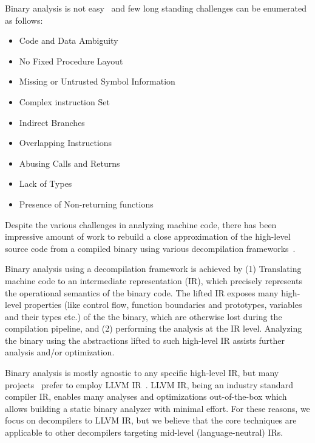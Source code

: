 Binary analysis is not easy~\cite{Meng:2016} and few long standing challenges
can be enumerated as follows:

\begin{itemize}
    \item Code and Data Ambiguity
    \item No Fixed Procedure Layout
    \item Missing or Untrusted Symbol Information
    \item Complex instruction Set
    \item Indirect Branches
    \item Overlapping Instructions
    \item Abusing Calls and Returns
    \item Lack of Types
    \item Presence of Non-returning functions
\end{itemize}

Despite the various challenges in analyzing machine code, there has been
impressive amount of work to rebuild a close approximation of the high-level
source code from a compiled binary using various decompilation
frameworks~\cite{McSema:Recon14,Remill,Angr1,BAP:CAV11,Radare2,FCD,BitBlaze:2008,hexray,Fokin:2011,eschulte2018bed,katz2018rnn,Schwartz:2013,IDA,mctoll,revgen}.

Binary analysis using a decompilation framework is achieved by (1) Translating machine code to an intermediate
representation (IR), which precisely represents the operational semantics of
the binary code. The lifted IR exposes many high-level properties (like control
    flow, function boundaries and prototypes, variables and their types etc.) of the
the binary, which are otherwise lost during the compilation pipeline, and (2)
  performing the analysis at the IR level.  Analyzing the binary using the
  abstractions lifted to such high-level IR assists further analysis and/or
  optimization. 

Binary analysis is mostly agnostic to any specific high-level IR, but many
projects~\cite{McSema:Recon14,Remill,FCD,reopt,mctoll} prefer to employ LLVM
IR~\cite{Lattner:2004}. LLVM IR, being an industry standard compiler IR,
  enables many analyses and optimizations out-of-the-box which allows building
  a static binary analyzer with minimal effort. For these reasons, we focus on decompilers to LLVM IR, but we believe that the core techniques are applicable to other decompilers targeting mid-level (language-neutral) IRs.   

